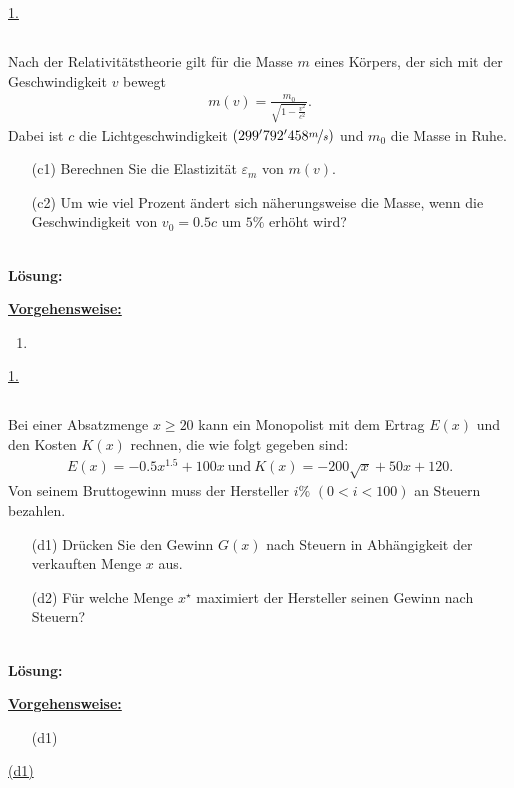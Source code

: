 \underline{1. }\\



\newpage
\subsection*{}
Nach der Relativitätstheorie gilt für die Masse $ m $ eines Körpers, der sich mit der Geschwindigkeit $ v $ bewegt
\begin{align*}
	m(v)
	=
	\frac{m_0}{\sqrt{1 - \frac{v^2}{c^2}}}.
\end{align*}
Dabei ist $ c $ die Lichtgeschwindigkeit $ (299'792'458 \nicefrac{m}{s}) $ und $ m_0 $ die Masse in Ruhe.
\begin{enumerate}
	\item[(c1)] Berechnen Sie die Elastizität $ \varepsilon_m $ von $ m(v) $.
	\item[(c2)] Um wie viel Prozent ändert sich näherungsweise die Masse, wenn die Geschwindigkeit von $ v_0 = 0.5c $ um $ 5 \% $ erhöht wird?
\end{enumerate}
\ \\
\textbf{Lösung:}
\begin{mdframed}
\underline{\textbf{Vorgehensweise:}}
\begin{enumerate}
\item 
\end{enumerate}
\end{mdframed}

\underline{1.}\\


\newpage
\subsection*{}
Bei einer Absatzmenge $ x \geq 20  $ kann ein Monopolist mit dem Ertrag $ E(x) $ und den Kosten $ K(x) $ rechnen, die wie folgt gegeben sind:
\begin{align*}
	E(x) = -0.5 x^{1.5} +100 x \ \textrm{und} \ K(x) = -200\sqrt{x} + 50 x +120.
\end{align*}
Von seinem Bruttogewinn muss der Hersteller $ i \% $  $ (0 < i < 100) $ an Steuern bezahlen.
\begin{enumerate}
	\item[(d1)]
	Drücken Sie den Gewinn $ G(x) $ nach Steuern in Abhängigkeit der verkauften Menge $ x $ aus.
	\item[(d2)] 
	Für welche Menge $ x^\star $ maximiert der Hersteller seinen Gewinn nach Steuern?
\end{enumerate}
\ \\
\textbf{Lösung:}
\begin{mdframed}
	\underline{\textbf{Vorgehensweise:}}
	\begin{enumerate}
		\item[(d1)] 
	\end{enumerate}
\end{mdframed}


\underline{(d1) }\\





